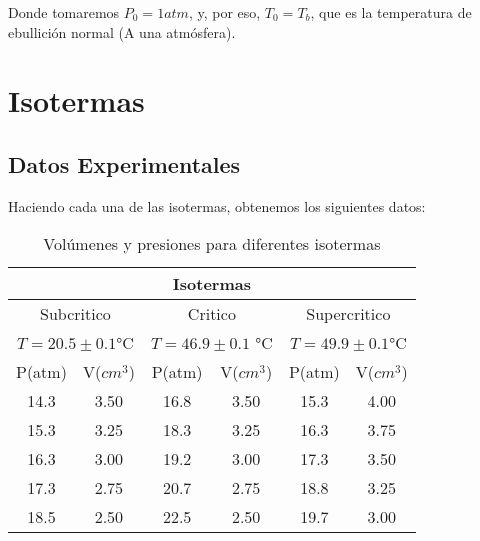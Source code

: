 \documentclass[a4paper,12pt]{article}
\begin{document}
Donde tomaremos $P_{0} = 1 atm$, y, por eso, $T_{0} = T_b $, que es la temperatura de ebullición normal (A una atmósfera).
\section{Isotermas}
\subsection{Datos Experimentales}
Haciendo cada una de las isotermas, obtenemos los siguientes datos:
\begin{table}[H]
  \caption{Volúmenes y presiones para diferentes isotermas }
    \centering
  \begin{tabular}{|cccccc|}
    \hline
    \multicolumn{6}{|c|}{Isotermas}                                                                                                                                        \\ \hline
    \multicolumn{2}{|c|}{Subcritico}                              & \multicolumn{2}{c|}{Critico}                                 & \multicolumn{2}{c|}{Supercritico}       \\ \hline
    \multicolumn{2}{|c|}{$T=20.5 \pm 0.1$°C}                      & \multicolumn{2}{c|}{$T=46.9 \pm 0.1$ °C}                     & \multicolumn{2}{c|}{$T=49.9\pm 0.1$°C}  \\ \hline
    \multicolumn{1}{|c|}{P(atm)} & \multicolumn{1}{c|}{V($cm^3$)} & \multicolumn{1}{c|}{P(atm)} & \multicolumn{1}{c|}{V($cm^3$)} & \multicolumn{1}{c|}{P(atm)} & V($cm^3$) \\ \hline
    \multicolumn{1}{|c|}{14.3}   & \multicolumn{1}{c|}{3.50}      & \multicolumn{1}{c|}{16.8}   & \multicolumn{1}{c|}{3.50}      & \multicolumn{1}{c|}{15.3}   & 4.00      \\ \hline
    \multicolumn{1}{|c|}{15.3}   & \multicolumn{1}{c|}{3.25}      & \multicolumn{1}{c|}{18.3}   & \multicolumn{1}{c|}{3.25}      & \multicolumn{1}{c|}{16.3}   & 3.75      \\ \hline
    \multicolumn{1}{|c|}{16.3}   & \multicolumn{1}{c|}{3.00}      & \multicolumn{1}{c|}{19.2}   & \multicolumn{1}{c|}{3.00}      & \multicolumn{1}{c|}{17.3}   & 3.50      \\ \hline
    \multicolumn{1}{|c|}{17.3}   & \multicolumn{1}{c|}{2.75}      & \multicolumn{1}{c|}{20.7}   & \multicolumn{1}{c|}{2.75}      & \multicolumn{1}{c|}{18.8}   & 3.25      \\ \hline
    \multicolumn{1}{|c|}{18.5}   & \multicolumn{1}{c|}{2.50}      & \multicolumn{1}{c|}{22.5}   & \multicolumn{1}{c|}{2.50}      & \multicolumn{1}{c|}{19.7}   & 3.00      \\ \hline

\end{tabular}
\end{table}
\end{document}
